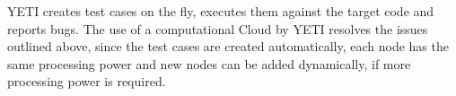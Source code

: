 YETI creates test cases on the fly, executes them against the target code and reports bugs. The use of a computational Cloud by YETI resolves the issues outlined above, 
since the test cases are created automatically, each node has the same processing power and new nodes can be added dynamically, if more processing power is required. 



